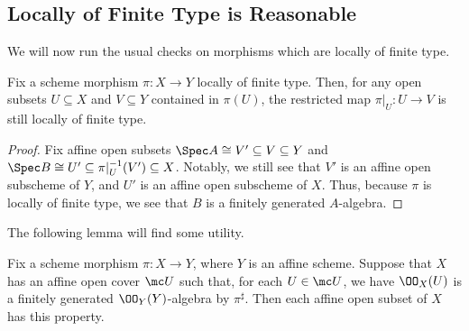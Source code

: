 \documentclass[../notes.tex]{subfiles}
\begin{document}
\subsection{Locally of Finite Type is Reasonable}
We will now run the usual checks on morphisms which are locally of finite type.
\begin{lemma} \label{lem:restrict-locally-ft}
	Fix a scheme morphism $\pi\colon X\to Y$ locally of finite type. Then, for any open subsets $U\subseteq X$ and $V\subseteq Y$ contained in $\pi(U)$, the restricted map $\pi|_U\colon U\to V$ is still locally of finite type.
\end{lemma}
\begin{proof}
	Fix affine open subsets $\Spec A\cong V'\subseteq V\subseteq Y$ and $\Spec B\cong U'\subseteq\pi|_U^{-1}(V')\subseteq X$. Notably, we still see that $V'$ is an affine open subscheme of $Y$, and $U'$ is an affine open subscheme of $X$. Thus, because $\pi$ is locally of finite type, we see that $B$ is a finitely generated $A$-algebra.
\end{proof}
The following lemma will find some utility.
\begin{lemma} \label{lem:locally-ft-local-on-source}
	Fix a scheme morphism $\pi\colon X\to Y$, where $Y$ is an affine scheme. Suppose that $X$ has an affine open cover $\mc U$ such that, for each $U\in\mc U$, we have $\OO_X(U)$ is a finitely generated $\OO_Y(Y)$-algebra by $\pi^\sharp$. Then each affine open subset of $X$ has this property.
\end{lemma}
\end{document}
